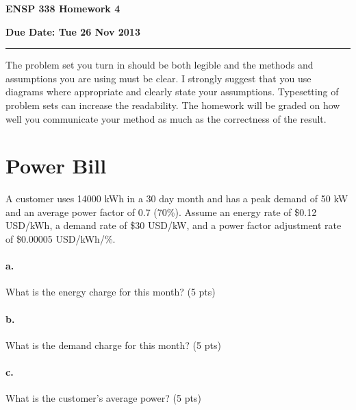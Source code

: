 \documentclass{article}
\newif\ifsolution
\newcommand{\chead}[1]
{\begin{center}\large\textbf{#1}\end{center}}
\newcommand{\solution}[1]
{\ifsolution
\vspace{10pt}
{\color{answer-color} #1}
\else\fi}
\begin{document}
\chead{ENSP 338 Homework 4}
\chead{Due Date:  Tue 26 Nov 2013}
\hrule
\vspace{10pt}

The problem set you turn in should be both legible and the methods and
assumptions you are using must be clear.  I strongly suggest that you
use diagrams where appropriate and clearly state your assumptions.
Typesetting of problem sets can increase the readability.  The homework
will be graded on how well you communicate your method as much as the
correctness of the result.


\section{Power Bill}

A customer uses 14000 kWh in a 30 day month and has a peak demand of 50 kW and an
average power factor of 0.7 (70\%).  Assume an energy rate of \$0.12 USD/kWh, a
demand rate of \$30 USD/kW, and a power factor adjustment rate of
\$0.00005 USD/kWh/\%.

\paragraph{a.} What is the energy charge for this month? (5 pts)

\solution{Energy charges are based on the electrical energy consumed
over the billing time period.
$$14000 kWh \cdot 0.12 USD/kWh = 1680 USD $$}

\paragraph{b.} What is the demand charge for this month? (5 pts)

\solution{Demand charges are based on the highest or peak level of power
consumption over the billing period.
$$ 50 kW peak \cdot 30 USD/kW peak = 1500 USD$$
}



\paragraph{c.} What is the customer's average power? (5 pts)

\solution{The total energy for the month should equal the average power
multiplied by the total time in one month, since energy equals power
multiplied by time.
$$ P_{avg} = \textrm{average power} = \frac{14000 kWh}{30 days\cdot 24
hr/day} = 19.4 kW $$
}
\end{document}
